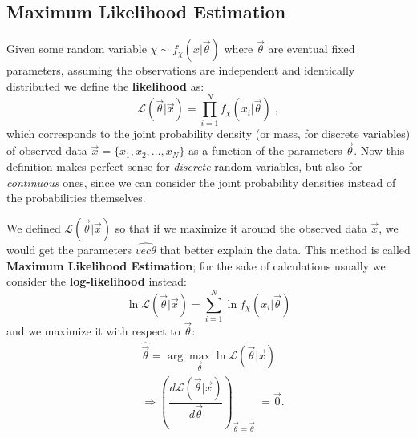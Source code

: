 \documentclass[12pt,a4paper]{article}
\begin{document}
\subsection{Maximum Likelihood Estimation}
Given some random variable $\chi \sim f_\chi(x | \vec{\theta})$ where
$\vec{\theta}$ are eventual fixed parameters, assuming the observations are independent and identically distributed
we define the \textbf{likelihood} as:
\begin{equation}
	\mathcal{L}(\vec{\theta} | \vec{x}) = \prod_{i=1}^{N}f_\chi(x_i | \vec{\theta}) \;,
\end{equation}
which corresponds to the joint probability density (or mass, for discrete variables) of 
observed data $\vec{x} = \{x_1, x_2, \dots, x_N\}$ as a function of the parameters
$\vec{\theta}$.
Now this definition makes perfect sense for \textit{discrete} random variables,
but also for \textit{continuous} ones, since we can consider the joint probability densities
instead of the probabilities themselves.

We defined $\mathcal{L}(\vec{\theta} | \vec{x})$ so that if we maximize it around the observed
data $\vec{x}$, we would get the parameters $\hat{vec{\theta}}$ that better explain the data.
This method is called \textbf{Maximum Likelihood Estimation}; for the sake of calculations
usually we consider the \textbf{log-likelihood} instead:
\begin{equation}
	\ln \mathcal{L}(\vec{\theta} | \vec{x}) = \sum_{i=1}^{N} \ln f_\chi(x_i | \vec{\theta})
\end{equation} 
and we maximize it with respect to $\vec{\theta}$:
\begin{align*}
	&\hat{\vec{\theta}} = \arg \max_{\vec{\theta}} \ln \mathcal{L}(\vec{\theta} | \vec{x})\\[5pt]
	&\Rightarrow \left( \dfrac{d\mathcal{L}(\vec{\theta} | \vec{x})}{d \vec{\theta}} \right)_{\vec{\theta} = \hat{\vec{\theta}}} \; = \vec{0}.
\end{align*}
\end{document}
